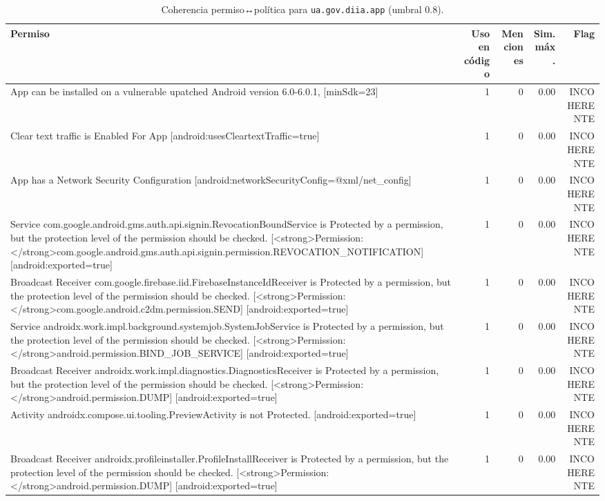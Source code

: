 \begin{table}[t]
\centering
\caption{Coherencia permiso↔política para \texttt{ua.gov.diia.app} (umbral 0.8).}
\small
\begin{tabular}{lrrrr}
\toprule
\textbf{Permiso} & \textbf{Uso en código} & \textbf{Menciones} & \textbf{Sim. máx.} & \textbf{Flag} \\
\midrule
App can be installed on a vulnerable upatched Android version 6.0-6.0.1, [minSdk=23] & 1 & 0 & 0.00 & INCOHERENTE \\
Clear text traffic is Enabled For App [android:usesCleartextTraffic=true] & 1 & 0 & 0.00 & INCOHERENTE \\
App has a Network Security Configuration [android:networkSecurityConfig=@xml/net_config] & 1 & 0 & 0.00 & INCOHERENTE \\
Service com.google.android.gms.auth.api.signin.RevocationBoundService is Protected by a permission, but the protection level of the permission should be checked. [<strong>Permission: </strong>com.google.android.gms.auth.api.signin.permission.REVOCATION_NOTIFICATION] [android:exported=true] & 1 & 0 & 0.00 & INCOHERENTE \\
Broadcast Receiver com.google.firebase.iid.FirebaseInstanceIdReceiver is Protected by a permission, but the protection level of the permission should be checked. [<strong>Permission: </strong>com.google.android.c2dm.permission.SEND] [android:exported=true] & 1 & 0 & 0.00 & INCOHERENTE \\
Service androidx.work.impl.background.systemjob.SystemJobService is Protected by a permission, but the protection level of the permission should be checked. [<strong>Permission: </strong>android.permission.BIND_JOB_SERVICE] [android:exported=true] & 1 & 0 & 0.00 & INCOHERENTE \\
Broadcast Receiver androidx.work.impl.diagnostics.DiagnosticsReceiver is Protected by a permission, but the protection level of the permission should be checked. [<strong>Permission: </strong>android.permission.DUMP] [android:exported=true] & 1 & 0 & 0.00 & INCOHERENTE \\
Activity androidx.compose.ui.tooling.PreviewActivity is not Protected. [android:exported=true] & 1 & 0 & 0.00 & INCOHERENTE \\
Broadcast Receiver androidx.profileinstaller.ProfileInstallReceiver is Protected by a permission, but the protection level of the permission should be checked. [<strong>Permission: </strong>android.permission.DUMP] [android:exported=true] & 1 & 0 & 0.00 & INCOHERENTE \\
\bottomrule
\end{tabular}
\end{table}

